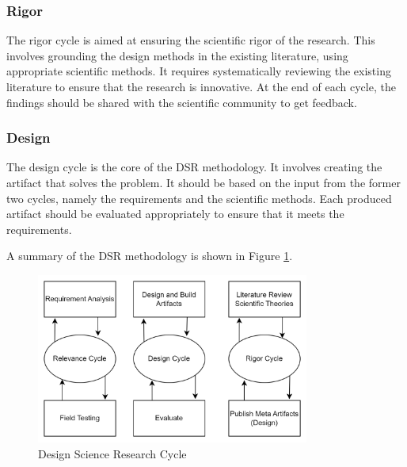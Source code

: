 \subsubsection{Rigor}
The rigor cycle is aimed at ensuring the scientific rigor of the research. This involves grounding the design methods in the existing literature, using appropriate scientific methods. It requires systematically reviewing the existing literature to ensure that the research is innovative. At the end of each cycle, the findings should be shared with the scientific community to get feedback.
\subsubsection{Design}
The design cycle is the core of the DSR methodology. It involves creating the artifact that solves the problem. It should be based on the input from the former two cycles, namely the requirements and the scientific methods. Each produced artifact should be evaluated appropriately to ensure that it meets the requirements. 

A summary of the DSR methodology is shown in Figure \ref{fig:dsr-cycle}.

\begin{figure}[ht]
    \centering
    \includegraphics[width=0.8\textwidth]{diagrams/conceptual/dsr-cycle.png}
    \caption{Design Science Research Cycle \cite{hevner_three_2007}}
    \label{fig:dsr-cycle}
\end{figure}

